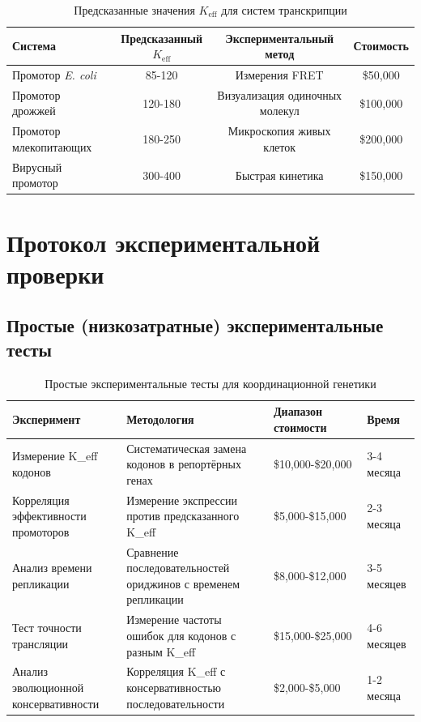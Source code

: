 \documentclass[12pt]{article}
\begin{document}
	\begin{table}[H]
		\centering
		\caption{Предсказанные значения $K_{\text{eff}}$ для систем транскрипции}
		\begin{tabular}{lccc}
			\toprule
			\textbf{Система} & \textbf{Предсказанный $K_{\text{eff}}$} & \textbf{Экспериментальный метод} & \textbf{Стоимость} \\
			\midrule
			Промотор \textit{E. coli} & 85-120 & Измерения FRET & \$50,000 \\
			Промотор дрожжей & 120-180 & Визуализация одиночных молекул & \$100,000 \\
			Промотор млекопитающих & 180-250 & Микроскопия живых клеток & \$200,000 \\
			Вирусный промотор & 300-400 & Быстрая кинетика & \$150,000 \\
			\bottomrule
		\end{tabular}
	\end{table}
	
	\section{Протокол экспериментальной проверки}
	
	\subsection{Простые (низкозатратные) экспериментальные тесты}
	
	\begin{table}[H]
		\centering
		\caption{Простые экспериментальные тесты для координационной генетики}
		\begin{tabular}{p{4cm}p{5cm}p{3cm}p{2cm}}
			\toprule
			\textbf{Эксперимент} & \textbf{Методология} & \textbf{Диапазон стоимости} & \textbf{Время} \\
			\midrule
			Измерение K\_eff кодонов & Систематическая замена кодонов в репортёрных генах & \$10,000-\$20,000 & 3-4 месяца \\
			Корреляция эффективности промоторов & Измерение экспрессии против предсказанного K\_eff & \$5,000-\$15,000 & 2-3 месяца \\
			Анализ времени репликации & Сравнение последовательностей ориджинов с временем репликации & \$8,000-\$12,000 & 3-5 месяцев \\
			Тест точности трансляции & Измерение частоты ошибок для кодонов с разным K\_eff & \$15,000-\$25,000 & 4-6 месяцев \\
			Анализ эволюционной консервативности & Корреляция K\_eff с консервативностью последовательности & \$2,000-\$5,000 & 1-2 месяца \\
			\bottomrule
		\end{tabular}
	\end{table}
	
\end{document}
